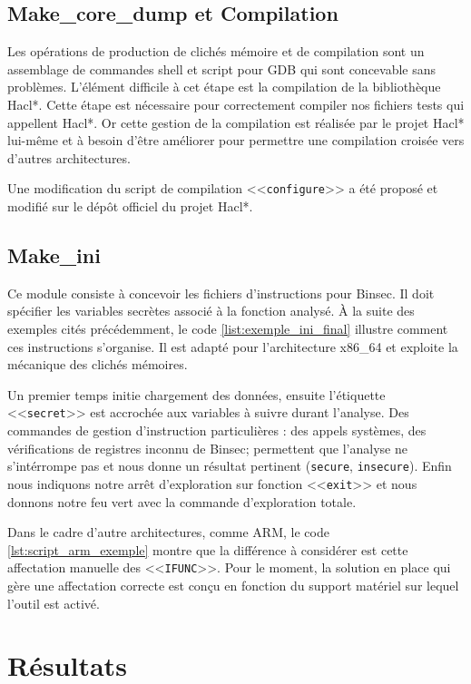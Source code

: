 \subsection*{Make\_core\_dump et Compilation}

Les opérations de production de clichés mémoire et de compilation sont un assemblage de commandes shell et script pour GDB qui sont concevable sans problèmes. L'élément difficile à cet étape est la compilation de la bibliothèque Hacl*. Cette étape est nécessaire pour correctement compiler nos fichiers tests qui appellent Hacl*. Or cette gestion de la compilation est réalisée par le projet Hacl* lui-même et à besoin d'être améliorer pour permettre une compilation croisée vers d'autres architectures.\smallbreak

Une modification du script de compilation <<\texttt{configure}>> a été proposé et modifié sur le dépôt officiel du projet Hacl*.

\subsection*{Make\_ini}

Ce module consiste à concevoir les fichiers d'instructions pour Binsec. Il doit spécifier les variables secrètes associé à la fonction analysé. À la suite des exemples cités précédemment, le code \ref{list:exemple_ini_final} illustre comment ces instructions s'organise. Il est adapté pour l'architecture x86\_64 et exploite la mécanique des clichés mémoires.\smallbreak

Un premier temps initie chargement des données, ensuite l'étiquette <<\texttt{secret}>> est accrochée aux variables à suivre durant l'analyse. Des commandes de gestion d'instruction particulières : des appels systèmes, des vérifications de registres inconnu de Binsec; permettent que l'analyse ne s'intérrompe pas et nous donne un résultat pertinent (\texttt{secure}, \texttt{insecure}). Enfin nous indiquons notre arrêt d'exploration sur fonction <<\texttt{exit}>> et nous donnons notre feu vert avec la commande d'exploration totale.\medbreak

Dans le cadre d'autre architectures, comme ARM, le code \ref{lst:script_arm_exemple} montre que la différence à considérer est cette affectation manuelle des <<\texttt{IFUNC}>>. Pour le moment, la solution en place qui gère une affectation correcte est conçu en fonction du support matériel sur lequel l'outil est activé.

\section{Résultats}

